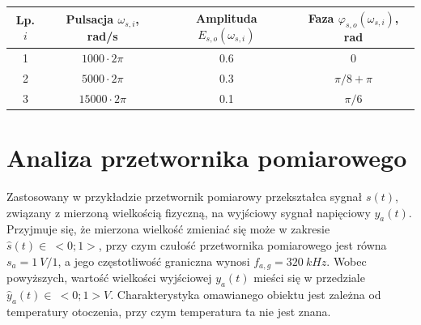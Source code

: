 \begin{table}[htb!]
\begin{center}
\begin{tabular}[c]{| c | c | c | c |} \hline
\textbf{Lp. $i$} & \textbf{Pulsacja $\omega_{s,i}$, rad/s} & \textbf{Amplituda $E_{s,o}(\omega_{s,i})$} & \textbf{Faza $\varphi_{s,o}(\omega_{s,i})$, rad} \\ \hline
1 & $1000  \cdot 2\pi$ &  \num{0.6} & $0$           \\ \hline
2 & $5000  \cdot 2\pi$ &  \num{0.3} & $\pi/8 + \pi$ \\ \hline
3 & $15000 \cdot 2\pi$ &  \num{0.1} & $\pi/6$       \\ \hline
\end{tabular}
\end{center}
\end{table}

\section{Analiza przetwornika pomiarowego}

Zastosowany w przykładzie przetwornik pomiarowy przekształca sygnał $s(t)$, związany z mierzoną wielkością fizyczną, na wyjściowy sygnał napięciowy $y_{a}(t)$. Przyjmuje się, że mierzona wielkość zmieniać się może w zakresie $\hat{s}(t) \in~<0;1>$, przy czym czułość przetwornika pomiarowego jest równa $s_{a} = \qty{1}{V \per 1}$, a jego częstotliwość graniczna wynosi $f_{a,g} = \qty{320}{kHz}$. Wobec powyższych, wartość wielkości wyjściowej $y_{a}(t)$ mieści się w przedziale $\hat{y}_{a}(t) \in~<0;1>\unit{V}$. Charakterystyka omawianego obiektu jest zależna od temperatury otoczenia, przy czym temperatura ta nie jest znana.

